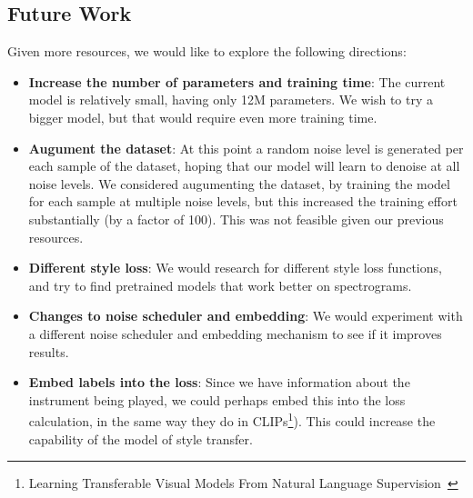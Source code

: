 \subsection{Future Work}

Given more resources, we would like to explore the following directions:
\begin{itemize}
    \item \textbf{Increase the number of parameters and training time}: The current model is relatively small, having only 12M parameters. We wish to try a bigger model, but that would require even more training time.
    \item \textbf{Augument the dataset}: At this point a random noise level is generated per each sample of the dataset, hoping that our model will learn to denoise at all noise levels. We considered augumenting the dataset, by training the model for each sample at multiple noise levels, but this increased the training effort substantially (by a factor of 100). This was not feasible given our previous resources.
    \item \textbf{Different style loss}: We would research for different style loss functions, and try to find pretrained models that work better on spectrograms.
    \item \textbf{Changes to noise scheduler and embedding}: We would experiment with a different noise scheduler and embedding mechanism to see if it improves results.
    \item \textbf{Embed labels into the loss}: Since we have information about the instrument being played, we could perhaps embed this into the loss calculation, in the same way they do in CLIPs\footnote{Learning Transferable Visual Models From Natural Language Supervision~\cite{radford2021learning}}). This could increase the capability of the model of style transfer.
\end{itemize}

